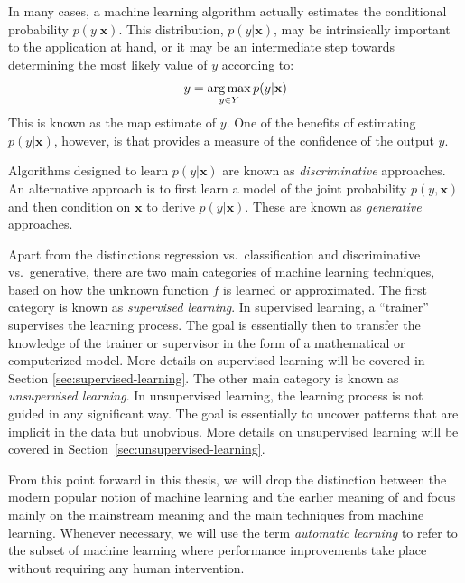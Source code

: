 In many cases, a machine learning algorithm actually estimates the conditional probability $p(y|\mathbf{x})$. This distribution, $p(y|\mathbf{x})$, may be intrinsically important to the application at hand, or it may be an intermediate step towards determining the most likely value of $y$ according to:
%
\begin{equation}
y = \operatorname*{arg\,max}_{y \in Y} p (y|\mathbf{x})
\end{equation}
%
This is known as the \gls{map} estimate of $y$. One of the benefits of estimating $p(y|\mathbf{x})$, however, is that provides a measure of the confidence of the output $y$.

Algorithms designed to learn $p(y|\mathbf{x})$ are known as \emph{discriminative} approaches. An alternative approach is to first learn a model of the joint probability $p(y,\mathbf{x})$ and then condition on $\mathbf{x}$ to derive $p(y|\mathbf{x})$. These are known as \emph{generative} approaches.



Apart from the distinctions regression vs.\ classification and discriminative vs.\ generative, there are two main categories of machine learning techniques, based on how the unknown function $f$ is learned or approximated. The first category is known as \emph{supervised learning}. In supervised learning, a ``trainer'' supervises the learning process. The goal is essentially then to transfer the knowledge of the trainer or supervisor in the form of a mathematical or computerized model. More details on supervised learning will be covered in Section \ref{sec:supervised-learning}. The other main category is known as \emph{unsupervised learning}. In unsupervised learning, the learning process is not guided in any significant way. The goal is essentially to uncover patterns that are implicit in the data but unobvious.   More details on unsupervised learning will be covered in Section~\ref{sec:unsupervised-learning}.

From this point forward in this thesis, we will drop the distinction between the modern popular notion of machine learning and the earlier meaning of \cite{Mitchell1990} and focus mainly on the mainstream meaning and the main techniques from machine learning. Whenever necessary, we will use the term \emph{automatic learning} to refer to the subset of machine learning where performance improvements take place without requiring any human intervention.
%
